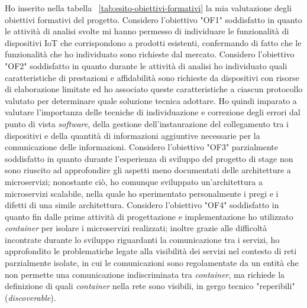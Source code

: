 Ho inserito nella tabella ~\ref{tab:esito-obiettivi-formativi} la mia valutazione degli obiettivi formativi del progetto.
Considero l'obiettivo "OF1" soddisfatto in quanto le attività di analisi svolte mi hanno permesso di individuare le funzionalità di dispositivi IoT che corrispondono a prodotti esistenti, confermando di fatto che le funzionalità che ho individuato sono richieste dal mercato.
Considero l'obiettivo "OF2" soddisfatto in quanto durante le attività di analisi ho individuato quali caratteristiche di prestazioni e affidabilità sono richieste da dispositivi con risorse di elaborazione limitate ed ho associato queste caratteristiche a ciascun protocollo valutato per determinare quale soluzione tecnica adottare. Ho quindi imparato a valutare l'importanza delle tecniche di individuazione e correzione degli errori dal punto di vista \emph{software}, della gestione dell'instaurazione del collegamento tra i dispositivi e della quantità di informazioni aggiuntive necessarie per la comunicazione delle informazioni.
Considero l'obiettivo "OF3" parzialmente soddisfatto in quanto durante l'esperienza di sviluppo del progetto di stage non sono riuscito ad approfondire gli aspetti meno documentati delle architetture a microservizi; nonostante ciò, ho comunque sviluppato un'architettura a microservizi scalabile, nella quale ho sperimentato personalmente i pregi e i difetti di una simile architettura.
Considero l'obiettivo "OF4" soddisfatto in quanto fin dalle prime attività di progettazione e implementazione ho utilizzato \emph{container} per isolare i microservizi realizzati; inoltre grazie alle difficoltà incontrate durante lo sviluppo riguardanti la comunicazione tra i servizi, ho approfondito le problematiche legate alla visibilità dei servizi nel contesto di reti parzialmente isolate, in cui le comunicazioni sono regolamentate da un entità che non permette una comunicazione indiscriminata tra \emph{container}, ma richiede la definizione di quali \emph{container} nella rete sono visibili, in gergo tecnico "reperibili" (\emph{discoverable}).

